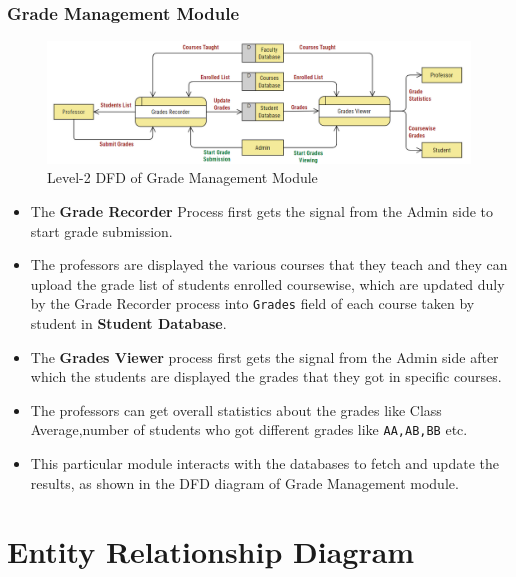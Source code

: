 \documentclass[12pt,a4paper]{article}
\begin{document}
\subsubsection{Grade Management Module}
\begin{figure}[hbt!]
    \centering
        \includegraphics[width=\linewidth]{Grade_Management_DFD.png} 
    \caption{Level-2 DFD of Grade Management Module}
\end{figure}
\begin{itemize}
    \item The \textbf{Grade Recorder} Process first gets the signal from the Admin side to start grade submission.
    \item The professors are displayed the various courses that they teach and they can upload the grade list of students enrolled coursewise, which are updated duly by the Grade Recorder process into \texttt{Grades} field of each course taken by student in \textbf{Student Database}.
    \item The \textbf{Grades Viewer} process first gets the signal from the Admin side after which the students are displayed the grades that they got in specific courses.
    \item The professors can get overall statistics about the grades like Class Average,number of students who got different grades like \texttt{AA,AB,BB} etc.
    \item This particular module interacts with the databases to fetch and update the results, as shown in the DFD diagram of Grade Management module.
\end{itemize}
\section{Entity Relationship Diagram}
\end{document}
